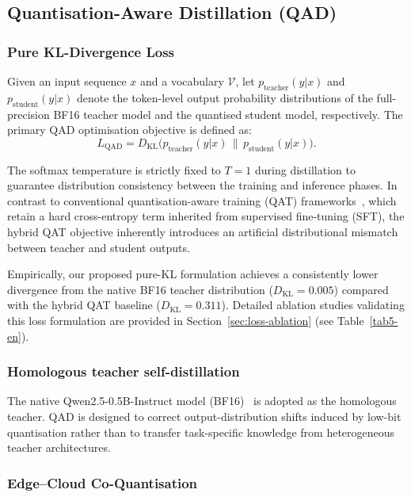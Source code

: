 \documentclass[a4paper,fleqn]{cas-sc}
\begin{document}
\subsection{Quantisation-Aware Distillation (QAD)}
\subsubsection{Pure KL-Divergence Loss}

Given an input sequence $x$ and a vocabulary $\mathcal{V}$, let $p_{\text{teacher}}(y|x)$ and $p_{\text{student}}(y|x)$ denote the token-level output probability distributions of the full-precision BF16 teacher model and the quantised student model, respectively. The primary QAD optimisation objective is defined as:
\begin{equation}
\label{eq:kl-loss}
L_{\mathrm{QAD}} = D_{\mathrm{KL}}\!\bigl( p_{\text{teacher}}(y|x)\,\|\,p_{\text{student}}(y|x) \bigr).
\end{equation}

The softmax temperature is strictly fixed to $T = 1$ during distillation to guarantee distribution consistency between the training and inference phases. In contrast to conventional quantisation-aware training (QAT) frameworks~\citep{24,25,26}, which retain a hard cross-entropy term inherited from supervised fine-tuning (SFT), the hybrid QAT objective inherently introduces an artificial distributional mismatch between teacher and student outputs.

Empirically, our proposed pure-KL formulation achieves a consistently lower divergence from the native BF16 teacher distribution ($D_{\mathrm{KL}} = 0.005$) compared with the hybrid QAT baseline ($D_{\mathrm{KL}} = 0.311$). Detailed ablation studies validating this loss formulation are provided in Section~\ref{sec:loss-ablation} (see Table~\ref{tab5-en}).

\subsubsection{Homologous teacher self-distillation}

The native Qwen2.5-0.5B-Instruct model (BF16)~\citep{27,28,29} is adopted as the homologous teacher. QAD is designed to correct output-distribution shifts induced by low-bit quantisation rather than to transfer task-specific knowledge from heterogeneous teacher architectures.

\subsubsection{Edge--Cloud Co-Quantisation}
\end{document}
